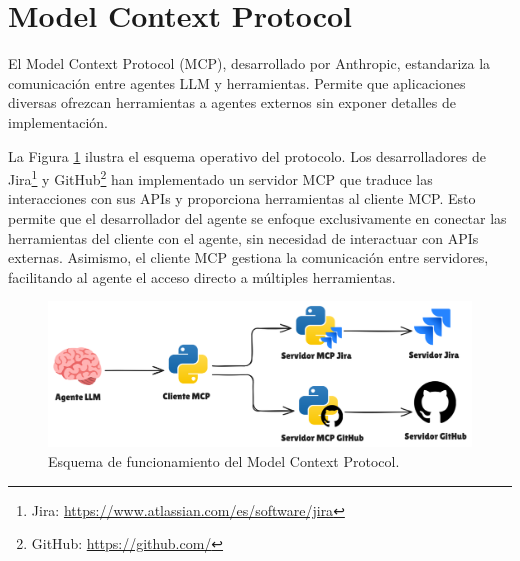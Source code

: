 \section{Model Context Protocol}
\label{sec:mcp_prots}
El Model Context Protocol (MCP), desarrollado por Anthropic, estandariza la comunicación entre agentes LLM y herramientas. Permite que aplicaciones diversas ofrezcan herramientas a agentes externos sin exponer detalles de implementación\cite{noauthor_model_nodate}.

La Figura \ref{fig:mcp} ilustra el esquema operativo del protocolo. Los desarrolladores de Jira\footnote{Jira: \url{https://www.atlassian.com/es/software/jira}} y GitHub\footnote{GitHub: \url{https://github.com/}} han implementado un servidor MCP que traduce las interacciones con sus APIs y proporciona herramientas al cliente MCP. Esto permite que el desarrollador del agente se enfoque exclusivamente en conectar las herramientas del cliente con el agente, sin necesidad de interactuar con APIs externas. Asimismo, el cliente MCP gestiona la comunicación entre servidores, facilitando al agente el acceso directo a múltiples herramientas.

\begin{figure}[H]
  \centering
  \includegraphics[width=1\linewidth]{figures/mcp.png}
  \caption{Esquema de funcionamiento del Model Context Protocol.}
  \label{fig:mcp}
\end{figure}


